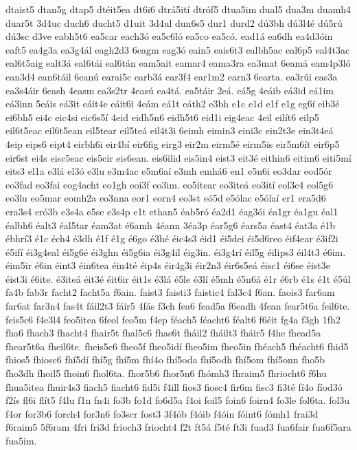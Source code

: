 {dtaist5
dtan5g
dtap5
dtéit5ea
dt6i6
dtrá5ití
dtróf5
dtua5im
dual5
dua3m
duamh4
duar5t
3d4uc
duch6
ducht5
d1uit
3d4ul
dun6s5
dur1
durd2
dú3bh
dú3l4é
dú5rú
dú3sc
d3ve
eabh5t6
ea5car
each3ó
ea5c6ló
ea5co
ea5có.
ead1á
ea6dh
ea4d3óin
eaft5
ea4g3a
ea3g4ál
eagh2d3
6eagm
eag3ó
eain5
eais6t3
ealbh5ac
eal6p5
eal4t3ac
eal6t5aig
ealt3á
eal6tái
eal6tán
eam5ait
eamar4
eama3ra
ea3mat
6eamá
eam4p3ló
ean3d4
ean6táil
6eanú
earai5c
earb3á
ear3f4
ear1m2
earn3
6earta.
ea3rúi
eas3a
ea3s4áir
6eash
4easm
ea3s2tr
4easú
ea4tá.
ea5táir
2eá.
eá5g
4eáib
eá3id
eá1im
eá3inn
5eáis
eá3it
eáit4e
eáit6i
4eám
eá1t
eáth2
e3bh
e1c
e1d
e1f
e1g
eg6í
eib3é
ei6bh5
ei4c
eic4si
eic6s5í
4eid
eidh5n6
eidh5t6
eid1i
eig4eac
4eil
eilít6
eilp5
eil6t5eac
eil6t5ean
eil5tear
eil5teá
eil4t3i
6eimh
eimin3
eini3c
ein2t3e
ein3t4eá
4eip
eips6
eipt4
eirbh6i
eir4bí
eir6fig
eirg3
eir2m
eirm5é
eirm5is
eir5m6ít
eir6p5
eir6st
ei4s
eisc5eac
eis5cir
eis6ean.
eis6ilid
eis5in4
eist3
eit3é
eithin6
eitim6
eiti5mí
eits3
el1a
e3lá
el3ó
e3lu
e3m4ac
e5m6aí
e3mh
emhá6
en1
e5n6i
eo3dar
eod5ór
eo3fad
eo3fai
eog4acht
eo1gh
eoi3f
eo3im.
eo5itear
eo3iteá
eo3ití
eol3c4
eol5g6
eo3lu
eo5mar
eomh2a
eo3nna
eor1
eorn4
eo3st
eó5d
e5ólac
e5ólaí
er1
era5d6
era3s4
eró3b
e3s4a
e5se
e3s4p
e1t
ethan5
éab5ró
éa2d1
éag3ói
éa1gr
éa1gu
éal1
éalbh6
éalt3
éal5tar
éam3at
é6amh
4éann
3éa3p
éar5g6
éars5a
éast4
éat3a
é1b
ébhrí3
é1c
éch4
é3dh
é1f
é1g
é6go
é3hé
éic4s3
éid1
éi5dei
éi5d6reo
éif4ear
é3if2i
é5ifí
éi3g4eal
éi5g6é
éi3ghn
éi5g6ia
éi3g4il
éig3in.
éi3g4rí
éil5g
éilips3
éil4t3
é6im.
éim5ir
é6in
éint3
éin6tea
éin4té
éip4s
éir4g3i
éir2n3
éir6s5eá
éisc1
éi6se
éist3e
éist3i
é6ite.
é3iteá
éit3é
éit6ir
éit1s
é3lá
é5le
é3lí
é5mh
é5n6á
é1r
é6rb
é1s
é1t
é5úl
fa4b
fab3r
facht2
facht5a
f6ain.
faist3
faisti3
faistic4
fal3c4
f6an.
faois3
far6am
far6at
far3n4
fas4t
fáil2t3
fáir5
4fás
f3ch
fea6
fead5a
f6eadh
4fean
fear5t6a
feil6te.
feis5c6
f4e3l4
feo5itea
6feol
feo5m
f4ep
féach5
féacht6
féalt6
f6éit
fg4a
f3gh
1fh2
fha6
fhach3
fhacht4
fhair5t
fhal5c6
fhas6t
fháil2
fháilt3
fháir5
f4he
fhead5a
fhear5t6a
fheil6te.
fheis5c6
fheo5f
fheo5idí
fheo5im
fheo5in
fhéach5
fhéacht6
fhid5
fhios5
fhiosc6
fhí5dí
fhí5g
fhí5m
fhí4o
fhí5oda
fhí5odh
fhí5om
fhí5onn
fho5b
fho3dh
fhoil5
fhoin6
fhol6ta.
fhor5b6
fhor5n6
fhómh3
fhraim5
fhriocht6
f6hu
fhua5itea
fhuir4s3
fiach5
fiacht6
fid5i
f4ill
fios3
fiosc4
fir6m
fisc3
fi3té
fí4o
fíod3ó
f2ís
fl6i
flít5
f4lu
f1n
fn4i
fo3b
fo1d
fo6d5a
f4oi
foil5
foin6
foirn4
fo3le
fol6ta.
fol3u
f4or
for3b6
forch4
for3n6
fo3scr
fost3
3f4ób
f4óib
f4óin
fóint6
fómh1
frai3d
f6raim5
5f6ram
4fri
fri3d
frioch3
friocht4
f2t
ft5á
f5té
ft3i
fuad3
fua6fair
fua6f5ara
fua5im.
}
